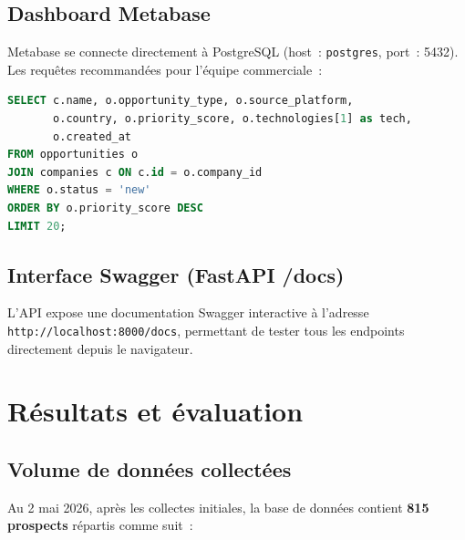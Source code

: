 \subsection{Dashboard Metabase}

Metabase se connecte directement à PostgreSQL (host~: \texttt{postgres},
port~: 5432). Les requêtes recommandées pour l'équipe commerciale~:

\begin{lstlisting}[language=SQL, caption={Top 20 prospects pour l'équipe commerciale}, label=lst:metabase]
SELECT c.name, o.opportunity_type, o.source_platform,
       o.country, o.priority_score, o.technologies[1] as tech,
       o.created_at
FROM opportunities o
JOIN companies c ON c.id = o.company_id
WHERE o.status = 'new'
ORDER BY o.priority_score DESC
LIMIT 20;
\end{lstlisting}

\subsection{Interface Swagger (FastAPI /docs)}

L'API expose une documentation Swagger interactive à l'adresse
\texttt{http://localhost:8000/docs}, permettant de tester tous les endpoints
directement depuis le navigateur.

\section{Résultats et évaluation}

\subsection{Volume de données collectées}

Au 2 mai 2026, après les collectes initiales, la base de données contient
\textbf{815 prospects} répartis comme suit~:

